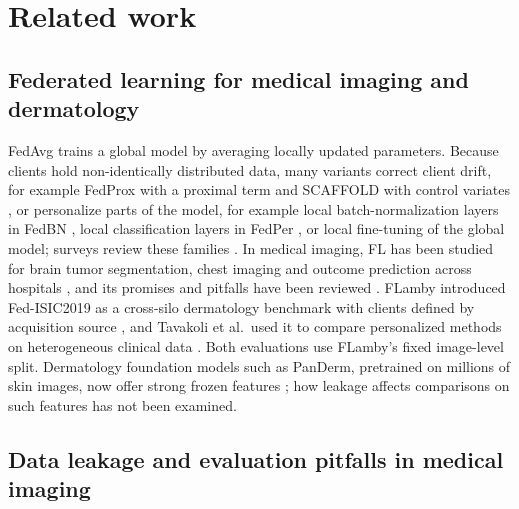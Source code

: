\section{Related work}
\label{sec:related}

\subsection{Federated learning for medical imaging and dermatology}

FedAvg \cite{mcmahan2017fedavg} trains a global model by averaging locally updated parameters. Because
clients hold non-identically distributed data, many variants correct client drift, for example FedProx
with a proximal term \cite{li2020fedprox} and SCAFFOLD with control variates
\cite{karimireddy2020scaffold}, or personalize parts of the model, for example local batch-normalization
layers in FedBN \cite{li2021fedbn}, local classification layers in FedPer \cite{arivazhagan2019fedper},
or local fine-tuning of the global model; surveys review these
families \cite{kairouz2021advances,tan2023pfl}. In medical imaging, FL has been studied for brain tumor
segmentation, chest imaging and outcome prediction across hospitals
\cite{sheller2020federated,dayan2021exam}, and its promises and pitfalls have been reviewed
\cite{rieke2020future}. FLamby introduced Fed-ISIC2019 as a cross-silo dermatology
benchmark with clients defined by acquisition source \cite{flamby2022}, and Tavakoli et al.\ used it to
compare personalized methods on heterogeneous clinical data \cite{tavakoli2024fendafl}. Both evaluations
use FLamby's fixed image-level split. Dermatology foundation models such as PanDerm, pretrained on
millions of skin images, now offer strong frozen features \cite{yan2025panderm}; how leakage affects
comparisons on such features has not been examined.

\subsection{Data leakage and evaluation pitfalls in medical imaging}


